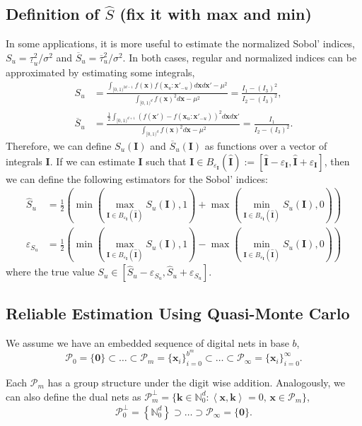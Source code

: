 \documentclass[]{elsarticle}
\theoremstyle{definition}
\newcommand{\bvec}[1]{\boldsymbol{#1}}
\newcommand{\vx}{\bvec{x}}
\newcommand{\vI}{\bvec{I}}
\newcommand{\vk}{\bvec{k}}
\newcommand{\ip}[3][{}]{\ensuremath{\left \langle #2, #3 \right \rangle_{#1}}}
\begin{document}
\subsection{Definition of $\widehat{S}$ (fix it with max and min)}
In some applications, it is more useful to estimate the normalized Sobol' indices, $S_u = \underline{\tau}_u^2/\sigma^2$ and $\overline{S}_u = \overline{\tau}_u^2/\sigma^2$. In both cases, regular and normalized indices can be approximated by estimating some integrals,
\begin{align*}
S_u & = \frac{\int_{[0,1)^{2d-1}} f(\vx)f(\vx_{u}:{\vx'}_{-u})d\vx d{\vx'} - \mu^2 }{\int_{[0,1)^{d}} f(\vx)^2 d{\vx}-\mu^2} = \frac{I_1-(I_3)^2}{I_2-(I_3)^2}, \\
\overline{S}_u & = \frac{\frac{1}{2}\int_{[0,1)^{d+1}}(f(\vx')-f(\vx_u:{\vx'}_{-u}))^2d\vx d{\vx'}}{\int_{[0,1)^{d}} f(\vx)^2 d{\vx}-\mu^2} = \frac{I_1}{I_2-(I_3)^2}.
\end{align*}
Therefore, we can define $S_u(\vI)$ and $\overline{S}_u(\vI)$ as functions over a vector of integrals $\vI$. If we can estimate $\vI$ such that $\vI\in B_{\varepsilon_{\vI}}(\widehat{\vI}):=[\widehat{\vI}-\varepsilon_{\vI},\widehat{\vI}+\varepsilon_{\vI} ]$, then we can define the following estimators for the Sobol' indices:
\begin{align*}
\widehat{S}_u & = \frac{1}{2}\left(\min\left(\max_{\vI\in B_{\varepsilon_{\vI}}(\widehat{\vI})} S_u(\vI),1\right) + \max\left(\min_{\vI\in B_{\varepsilon_{\vI}}(\widehat{\vI})} S_u(\vI),0\right) \right) \\
\varepsilon_{S_u} & = \frac{1}{2}\left(\min\left(\max_{\vI\in B_{\varepsilon_{\vI}}(\widehat{\vI})} S_u(\vI),1\right) - \max\left(\min_{\vI\in B_{\varepsilon_{\vI}}(\widehat{\vI})} S_u(\vI),0\right) \right)
\end{align*}
where the true value $S_u\in [\widehat{S}_u - \varepsilon_{S_u}, \widehat{S}_u + \varepsilon_{S_u}]$.

\subsection{Reliable Estimation Using Quasi-Monte Carlo}

We assume we have an embedded sequence of digital nets in base $b$,
\[
\mathcal{P}_0=\{\bvec{0}\}\subset\dots\subset\mathcal{P}_m=\{\vx_i\}_{i=0}^{b^m}\subset\dots\subset\mathcal{P}_\infty=\{\vx_i\}_{i=0}^{\infty}.
\]

Each $\mathcal{P}_m$ has a group structure under the digit wise addition. Analogously, we can also define the dual nets as $\mathcal{P}_m^\perp=\{\vk\in\mathbb{N}_0^d:\ip{\vx}{\vk}=0,\, \vx\in\mathcal{P}_m\}$,
\[
\mathcal{P}_0^\perp=\left\{\mathbb{N}_0^d\right\}\supset\dots\supset\mathcal{P}_\infty=\{\bvec{0}\}.
\]
\end{document}
